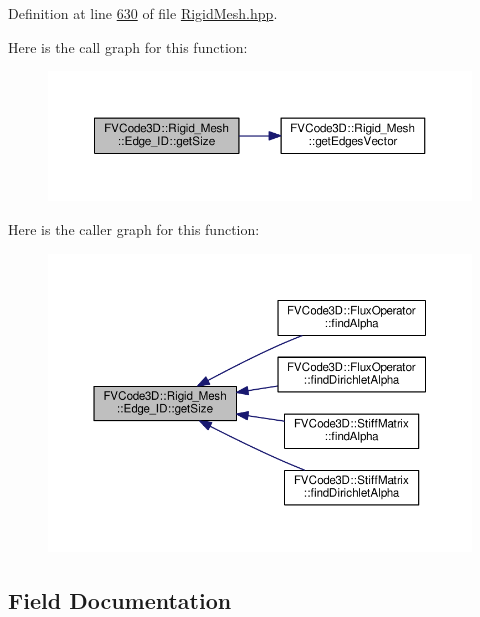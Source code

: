 Definition at line \hyperlink{RigidMesh_8hpp_source_l00630}{630} of file \hyperlink{RigidMesh_8hpp_source}{Rigid\+Mesh.\+hpp}.



Here is the call graph for this function\+:
\nopagebreak
\begin{figure}[H]
\begin{center}
\leavevmode
\includegraphics[width=350pt]{classFVCode3D_1_1Rigid__Mesh_1_1Edge__ID_a3834b95f5044df3e95afb2bf657693f6_cgraph}
\end{center}
\end{figure}




Here is the caller graph for this function\+:
\nopagebreak
\begin{figure}[H]
\begin{center}
\leavevmode
\includegraphics[width=350pt]{classFVCode3D_1_1Rigid__Mesh_1_1Edge__ID_a3834b95f5044df3e95afb2bf657693f6_icgraph}
\end{center}
\end{figure}




\subsection{Field Documentation}
